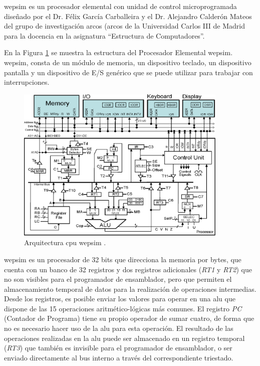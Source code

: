 \acrshort{wepsim} es un procesador elemental con unidad de control microprogramada diseñado por el Dr. Félix García Carballeira y el Dr. Alejandro Calderón Mateos del grupo de investigación \acrshort{arcos} (\acrlong{arcos} de la Universidad Carlos III de Madrid para la docencia en la asignatura ``Estructura de Computadores''.

En la Figura \ref{fig:wepsimCPU_figure} se muestra la estructura del Procesador Elemental \acrshort{wepsim}. \acrshort{wepsim}, consta de un módulo de memoria, un dispositivo teclado, un dispositivo pantalla y un dispositivo de E/S genérico que se puede utilizar para trabajar con interrupciones.

\begin{figure}[htbp]
 	\centering
 	\includegraphics[width=0.9\textwidth]{figures/processor6}
 	\caption{Arquitectura \acrshort{cpu} \acrshort{wepsim} .}
	\label{fig:wepsimCPU_figure}
\end{figure}


\acrshort{wepsim} es un procesador de 32 bits que direcciona la memoria por bytes, que cuenta con un banco de 32 registros y dos registros adicionales (\emph{RT1} y \emph{RT2}) que no son visibles para el programador de \gls{ensamblador}, pero que permiten el almacenamiento temporal de datos para la realización de operaciones intermedias. Desde los registros, es posible enviar los valores para operar en una \acrfull{alu} que dispone de las 15 operaciones aritmético-lógicas más comunes. El registro \emph{PC} (Contador de Programa) tiene su propio operador de sumar cuatro, de forma que no es necesario hacer uso de la \acrshort{alu} para esta operación. El resultado de las operaciones realizadas en la \acrshort{alu} puede ser almacenado en un registro temporal (\emph{RT3}) que también es invisible para el programador de \gls{ensamblador}, o ser enviado directamente al bus interno a través del correspondiente triestado.

